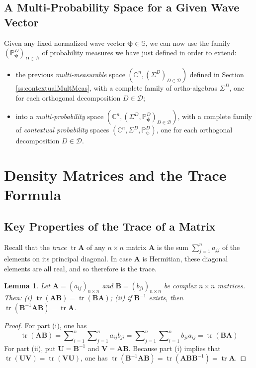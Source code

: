 \documentclass[11pt]{article}
\newcommand \C { \mathbb{C} }
\newcommand \Sph { \mathbb{S} }
\DeclareMathOperator{\tr}{tr}
\newtheorem{lemma}[theorem]{Lemma}
\begin{document}
\subsection{A Multi-Probability Space for a Given Wave Vector} \label{ss:multProbSpace}

Given any fixed normalized wave vector $ \boldsymbol \psi \in \Sph $,
we can now use the family $( \mathbb P^D_{ \boldsymbol \psi } )_{D \in \mathcal D} $ 
of probability measures we have just defined in order to extend:
\begin{itemize}
	\item the previous \emph{multi-measurable} space
	 $( \C^n, ( \Sigma ^D )_{D \in \mathcal D}) $
	defined in Section \ref{ss:contextualMultMeas},
    with a complete family of ortho-algebras $ \Sigma ^D $,
    one for each orthogonal decomposition $D \in \mathcal D$;
\item into a \emph{multi-probability} space 
 \( ( \C^n, ( \Sigma ^D, \mathbb P^D_{ \boldsymbol \psi } )_{D \in \mathcal D}) \),
    with a complete family of \emph{contextual probability} spaces
 \( ( \C^n, \Sigma ^D, \mathbb P^D_{ \boldsymbol \psi }) \),
    one for each orthogonal decomposition $D \in \mathcal D$.
\end{itemize}

\section{Density Matrices and the Trace Formula} \label{s:densityMatrices}
\subsection{Key Properties of the Trace of a Matrix}

Recall that the \emph{trace} $ \tr \mathbf A$ of any $n \times n$ matrix $ \mathbf A$ 
is the sum $ \sum _{j = 1}^n a_{jj} $ of the elements on its principal diagonal. 
In case $ \mathbf A$ is Hermitian, these diagonal elements are all real, 
and so therefore is the trace.

\begin{lemma} \label{propTrace}
	Let $ \mathbf A = ( a_{ij} )_{n \times n} $ and $ \mathbf B = ( b_{ji} )_{n \times n} $
	be complex $n \times n$ matrices.
	Then: (i) $ \tr ( \mathbf {AB} ) = \tr ( \mathbf {BA} )$;
	(ii) if $ \mathbf B^{-1} $ exists,
	then $ \tr ( \mathbf B^{-1} \mathbf {AB} ) = \tr \mathbf A$.   
\end{lemma}

\begin{proof} 
For part (i), one has
\[ \tr ( \mathbf {AB} ) = \sum\nolimits _{i = 1}^n \sum\nolimits _{j = 1}^n a_{ij} b_{ji}
					= \sum\nolimits _{j = 1}^n \sum\nolimits _{i = 1}^n b_{ji} a_{ij} 
					= \tr ( \mathbf {BA} ) \]
For part (ii), put $ \mathbf U = \mathbf B^{-1} $ and $ \mathbf V = \mathbf {AB} $. 
Because part (i) implies that $ \tr ( \mathbf {UV} ) = \tr ( \mathbf {VU} )$,
one has $ \tr ( \mathbf B^{-1} \mathbf {AB} ) = \tr ( \mathbf {ABB}^{-1} ) = \tr \mathbf A$.
\end{proof}
\end{document}

